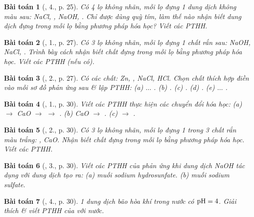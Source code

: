 \documentclass{article}
\newtheorem{baitoan}{Bài toán}
\begin{document}
\begin{baitoan}[\cite{SGK_Hoa_Hoc_9}, 4., p. 25]
	Có 4 lọ không nhãn, mỗi lọ đựng 1 dung dịch không màu sau: \emph{NaCl, , NaOH, }. Chỉ được dùng quỳ tím, làm thế nào nhận biết dung dịch đựng trong mỗi lọ bằng phương pháp hóa học? Viết các PTHH.
\end{baitoan}

\begin{baitoan}[\cite{SGK_Hoa_Hoc_9}, 1., p. 27]
	Có 3 lọ không nhãn, mỗi lọ đựng 1 chất rắn sau: \emph{NaOH, NaCl, }. Trình bày cách nhận biết chất đựng trong mỗi lọ bằng phương pháp hóa học. Viết các PTHH (nếu có).
\end{baitoan}

\begin{baitoan}[\cite{SGK_Hoa_Hoc_9}, 2., p. 27]
	Có các chất: \emph{Zn, , NaCl, HCl}. Chọn chất thích hợp điền vào mỗi sơ đồ phản ứng sau \& lập PTHH: (a) \emph{$\ldots$ }. (b) \emph{}. (c) \emph{}. (d) \emph{}. (e) \emph{$\ldots$ }.
\end{baitoan}

\begin{baitoan}[\cite{SGK_Hoa_Hoc_9}, 1., p. 30]
	Viết các PTHH thực hiện các chuyển đổi hóa học: (a) \emph{ $\to$ CaO $\to$  $\to$ }. (b) \emph{CaO $\to$ }. (c) \emph{ $\to$ }.
\end{baitoan}

\begin{baitoan}[\cite{SGK_Hoa_Hoc_9}, 2., p. 30]
	Có 3 lọ không nhãn, mỗi lọ đựng 1 trong 3 chất rắn màu trắng: \emph{, CaO}. Nhận biết chất đựng trong mỗi lọ bằng phương pháp hóa học. Viết các PTHH.
\end{baitoan}

\begin{baitoan}[\cite{SGK_Hoa_Hoc_9}, 3., p. 30]
	Viết các PTHH của phản ứng khi dung dịch \emph{NaOH} tác dụng với dung dịch \emph{} tạo ra: (a) muối sodium hydrosunfate. (b) muối sodium sulfate.
\end{baitoan}

\begin{baitoan}[\cite{SGK_Hoa_Hoc_9}, 4., p. 30]
	1 dung dịch bão hòa khí \emph{} trong nước có $\rm pH = 4$. Giải thích \& viết PTHH của \emph{} với nước.
\end{baitoan}
\end{document}
